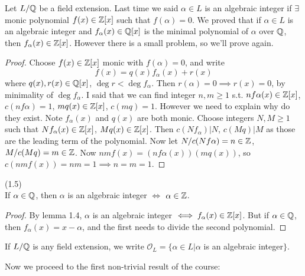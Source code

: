 \documentclass[a4paper]{article}
\begin{document}
Let $L/\mathbb{Q}$ be a field extension. Last time we said $\alpha \in L$ is an algebraic integer if $\exists$ monic polynomial $f(x) \in \mathbb{Z}[x]$ such that $f(\alpha) = 0$. We proved that if $\alpha \in L$ is an algebraic integer and $f_\alpha(x) \in \mathbb{Q}[x]$ is the minimal polynomial of $\alpha$ over $\mathbb{Q}$, then $f_\alpha(x) \in \mathbb{Z}[x]$. However there is a small problem, so we'll prove again.
\begin{proof}
Choose $f(x) \in \mathbb{Z}[x]$ monic with $f(\alpha) = 0$, and write $$f(x) = q(x) f_\alpha(x) + r(x)$$ where $q(x),r(x) \in \mathbb{Q}[x]$, $\deg r < \deg f_\alpha$. Then $r(\alpha) = 0 \implies r(x) = 0$, by minimality of $\deg f_\alpha$. I said that we can find integer $n,m \geq 1$ s.t. $nf\alpha(x) \in \mathbb{Z}[x]$, $c(nf\alpha) = 1$, $mq(x) \in \mathbb{Z}[x]$, $c(mq) = 1$. However we need to explain why do they exist. Note $f_\alpha(x)$ and $q(x)$ are both monic. Choose integers $N,M \geq 1$ such that $Nf_\alpha(x) \in \mathbb{Z}[x]$, $Mq(x) \in \mathbb{Z}[x]$. Then $c(Nf_\alpha) | N$, $c(Mq)|M$ as those are the leading term of the polynomial. Now let $N/c(Nf\alpha) = n \in \mathbb{Z}$, $M/c(Mq) = m \in \mathbb{Z}$. Now $nmf(x) = (nf\alpha(x)) (mq(x))$, so $c(nmf(x)) = nm = 1 \implies n=m=1$.
\end{proof}

\begin{coro} (1.5)\\
If $\alpha \in \mathbb{Q}$, then $\alpha$ is an algebraic integer $\iff$ $\alpha \in \mathbb{Z}$.
\begin{proof}
By lemma 1.4, $\alpha$ is an algebraic integer $\iff f_\alpha(x) \in \mathbb{Z}[x]$. But if $\alpha \in \mathbb{Q}$, then $f_\alpha(x) = x-\alpha$, and the first needs to divide the second polynomial.
\end{proof}
\end{coro}

\begin{notation}
If $L/\mathbb{Q}$ is any field extension, we write $\mathcal{O}_L =\{\alpha \in L | \alpha$ is an algebraic integer$\}$.
\end{notation}

Now we proceed to the first non-trivial result of the course:
\end{document}
